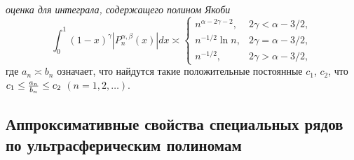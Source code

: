 {\em оценка для интеграла, содержащего полином Якоби }
\begin{equation}\label{Ykbeq.1.2.4.2.7}%
\int_0^1(1-x)^\gamma|P_n^{\alpha,\beta}(x)|dx\asymp
 \begin{cases}
 n^{\alpha-2\gamma-2},&\text{$2\gamma<\alpha-3/2$},\\
n^{-1/2}\ln n ,&\text{$2\gamma=\alpha-3/2$},\\
n^{-1/2},&\text{$2\gamma>\alpha-3/2$},
\end{cases}
\end{equation}
где $a_n\asymp b_n$  означает, что найдутся такие положительные постоянные $c_1$, $c_2$, что $c_1\le {a_n\over b_n}\le c_2$  $(n=1,2,\ldots)$.



\subsection{ Аппроксимативные свойства специальных рядов по  ультрасферическим полиномам}

